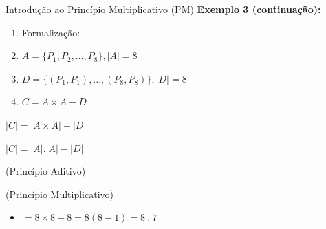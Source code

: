 \documentclass[aspectratio=169]{beamer}
\begin{document}
\begin{frame}{Introdução ao Princípio Multiplicativo (PM)}
    \textbf{Exemplo 3 (continuação):}

    \vspace{2mm}

        \begin{enumerate}[b]
            \item Formalização:
            \item[] $A = \{ P_1, P_2, ..., P_8\}, |A| = 8 $
            \item[] $D = \{ (P_1, P_1), ..., (P_8, P_8) \}, |D| = 8$
            \item[] $C=A \times A - D$
        \end{enumerate}

    \vspace{2mm}
   

    \begin{center}
        \begin{multicols}{2}
            $|C| = |A \times A| - |D|$

            $|C| = |A| . |A|-|D|$
            \columnbreak

            (Princípio Aditivo)

            (Princípio Multiplicativo)
        \end{multicols}
    \end{center}

    \vspace{3mm}
    \begin{itemize}
        \item[] $= 8 \times 8 - 8 = 8(8 - 1) = 8 ~ .~  7$
    \end{itemize}
    

\end{frame}
\end{document}
